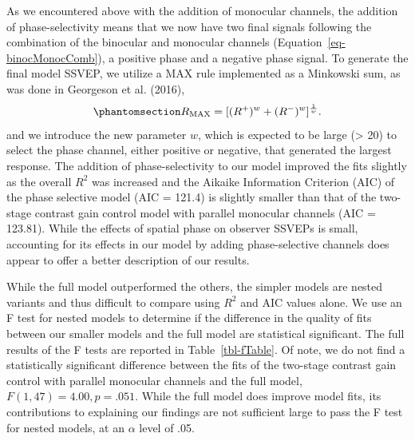 \documentclass[
  12pt,
]{article}
\begin{document}
As we encountered above with the addition of monocular channels, the
addition of phase-selectivity means that we now have two final signals
following the combination of the binocular and monocular channels
(Equation~\ref{eq-binocMonocComb}), a positive phase and a negative
phase signal. To generate the final model SSVEP, we utilize a MAX rule
implemented as a Minkowski sum, as was done in Georgeson et al. (2016),
\begin{equation}\phantomsection\label{eq-finalSum}{
R_\text{MAX} = [(R^+)^w+(R^-)^w]^{\frac{1}{w}}.
}\end{equation} and we introduce the new parameter \(w\), which is
expected to be large (\textgreater{} 20) to select the phase channel,
either positive or negative, that generated the largest response. The
addition of phase-selectivity to our model improved the fits slightly as
the overall \(R^2\) was increased and the Aikaike Information Criterion
(AIC) of the phase selective model (AIC = 121.4) is slightly smaller
than that of the two-stage contrast gain control model with parallel
monocular channels (AIC = 123.81). While the effects of spatial phase on
observer SSVEPs is small, accounting for its effects in our model by
adding phase-selective channels does appear to offer a better
description of our results.

While the full model outperformed the others, the simpler models are
nested variants and thus difficult to compare using \(R^2\) and AIC
values alone. We use an F test for nested models to determine if the
difference in the quality of fits between our smaller models and the
full model are statistical significant. The full results of the F tests
are reported in Table~\ref{tbl-fTable}. Of note, we do not find a
statistically significant difference between the fits of the two-stage
contrast gain control with parallel monocular channels and the full
model, \(F(1,47) = 4.00, p = .051\). While the full model does improve
model fits, its contributions to explaining our findings are not
sufficient large to pass the F test for nested models, at an \(\alpha\)
level of .05.
\end{document}
